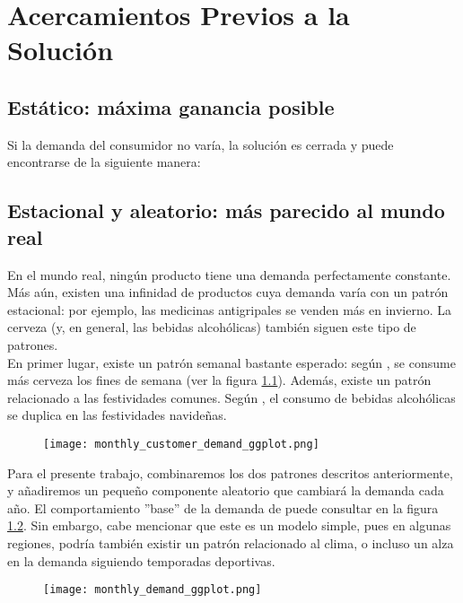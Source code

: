 \chapter{Acercamientos Previos a la Soluci\'on}

\section{Est\'atico: m\'axima ganancia posible}

Si la demanda del consumidor no var\'ia, la soluci\'on es cerrada y puede encontrarse de la siguiente manera:

\section{Estacional y aleatorio: m\'as parecido al mundo real}

En el mundo real, ning\'un producto tiene una demanda perfectamente constante. M\'as a\'un, existen una infinidad de productos cuya demanda var\'ia con un patr\'on estacional: por ejemplo, las medicinas antigripales se venden m\'as en invierno. La cerveza (y, en general, las bebidas alcoh\'olicas) tambi\'en siguen este tipo de patrones.\\

En primer lugar, existe un patr\'on semanal bastante esperado: seg\'un \citet{}, se consume m\'as cerveza los fines de semana (ver la figura \ref{weekly_base}). Adem\'as, existe un patr\'on relacionado a las festividades comunes. Seg\'un \citet{}, el consumo de bebidas alcoh\'olicas se duplica en las festividades navide\~nas. \\

\begin{figure}[h]
\caption{ }
\label{weekly_base}
\texttt{[image: monthly\_customer\_demand\_ggplot.png]}
\centering
\end{figure}

Para el presente trabajo, combinaremos los dos patrones descritos anteriormente, y a\~nadiremos un peque\~no componente aleatorio que cambiar\'a la demanda cada a\~no. El comportamiento ''base'' de la demanda de puede consultar en la figura \ref{yearly_base}. Sin embargo, cabe mencionar que este es un modelo simple, pues en algunas regiones, podr\'ia tambi\'en existir un patr\'on relacionado al clima, o incluso un alza en la demanda siguiendo temporadas deportivas. \\

\begin{figure}[h]
\caption{ }
\label{yearly_base}
\texttt{[image: monthly\_demand\_ggplot.png]}
\centering
\end{figure}


